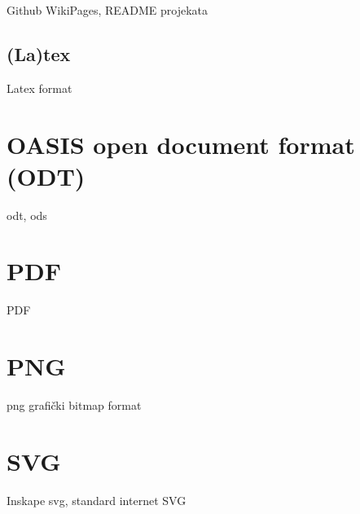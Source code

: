 \documentclass[times, utf8, seminar]{fit}
\begin{document}
Github WikiPages, README projekata

\subsection{(La)tex}

Latex format

\section{OASIS open document format (ODT)}

odt, ods

\section{PDF}

PDF

\section{PNG}

png grafički bitmap format

\section{SVG}

Inskape svg, standard internet SVG


%
%
\end{document}
